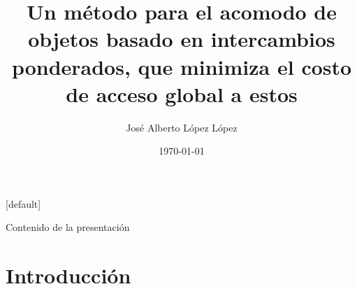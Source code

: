 \documentclass[14pt, aspectratio = 1610, xcolor=table, structureblod]{beamer}
\title[Acomodo de objetos para su acceso posterior]{%
	Un método para el acomodo de objetos basado en intercambios ponderados, que minimiza el costo de acceso global a estos%
}
\author{José Alberto López López}
\institute{Universidad Veracruzana}
\date{\today}
\begin{document}



\fontsize{16}{19}\selectfont
\beamertemplatenavigationsymbolsempty
\frame[plain]{\titlepage}


\begingroup
{}[default]
\makeatletter
\def\beamer@entrycode{\vspace*{-9.75pt}}
\makeatother
\begin{frame}{Contenido de la presentación}
\tableofcontents
\end{frame}
\endgroup


\section{Introducción}


\end{document}
